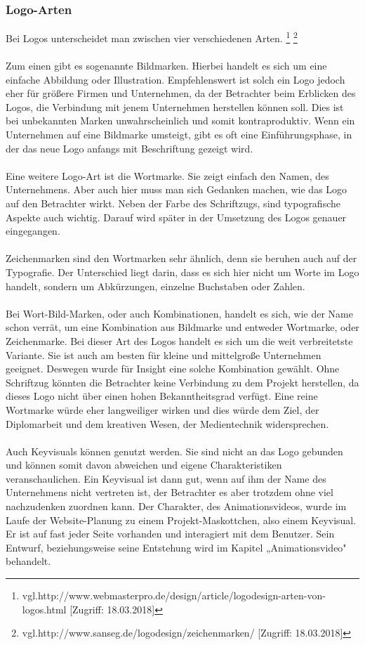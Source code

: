 \subsubsection{Logo-Arten}
Bei Logos unterscheidet man zwischen vier verschiedenen Arten. \footnote{\label{} vgl.http://www.webmasterpro.de/design/article/logodesign-arten-von-logos.html [Zugriff: 18.03.2018]} \footnote{\label{} vgl.http://www.sanseg.de/logodesign/zeichenmarken/ [Zugriff: 18.03.2018]}
\\
\\
Zum einen gibt es sogenannte Bildmarken. Hierbei handelt es sich um eine einfache Abbildung oder Illustration. Empfehlenswert ist solch ein Logo jedoch eher für größere Firmen und Unternehmen, da der Betrachter beim Erblicken des Logos, die Verbindung mit jenem Unternehmen herstellen können soll. Dies ist bei unbekannten Marken unwahrscheinlich und somit kontraproduktiv. Wenn ein Unternehmen auf eine Bildmarke umsteigt, gibt es oft eine Einführungsphase, in der das neue Logo anfangs mit Beschriftung gezeigt wird.
\\
\\
Eine weitere Logo-Art ist die Wortmarke. Sie zeigt einfach den Namen, des Unternehmens. Aber auch hier muss man sich Gedanken machen, wie das Logo auf den Betrachter wirkt. Neben der Farbe des Schriftzugs, sind typografische Aspekte auch wichtig. Darauf wird später in der Umsetzung des Logos genauer eingegangen.
\\
\\
Zeichenmarken sind den Wortmarken sehr ähnlich, denn sie beruhen auch auf der Typografie. Der Unterschied liegt darin, dass es sich hier nicht um Worte im Logo handelt, sondern um Abkürzungen, einzelne Buchstaben oder Zahlen.
\\
\\
Bei Wort-Bild-Marken, oder auch Kombinationen, handelt es sich, wie der Name schon verrät, um eine Kombination aus Bildmarke und entweder Wortmarke, oder Zeichenmarke. Bei dieser Art des Logos handelt es sich um die weit verbreitetste Variante. Sie ist auch am besten für kleine und mittelgroße Unternehmen geeignet. Deswegen wurde für Insight eine solche Kombination gewählt. Ohne Schriftzug könnten die Betrachter keine Verbindung zu dem Projekt herstellen, da dieses Logo nicht über einen hohen Bekanntheitsgrad verfügt. Eine reine Wortmarke würde eher langweiliger wirken und dies würde dem Ziel, der Diplomarbeit und dem kreativen Wesen, der Medientechnik widersprechen.
\\
\\
Auch Keyvisuals können genutzt werden. Sie sind nicht an das Logo gebunden und können somit davon abweichen und eigene Charakteristiken veranschaulichen. Ein Keyvisual ist dann gut, wenn auf ihm der Name des Unternehmens nicht vertreten ist, der Betrachter es aber trotzdem ohne viel nachzudenken zuordnen kann. Der Charakter, des Animationsvideos, wurde im Laufe der Website-Planung zu einem Projekt-Maskottchen, also einem Keyvisual. Er ist auf fast jeder Seite vorhanden und interagiert mit dem Benutzer. Sein Entwurf, beziehungsweise seine Entstehung wird im Kapitel „Animationsvideo" behandelt.

